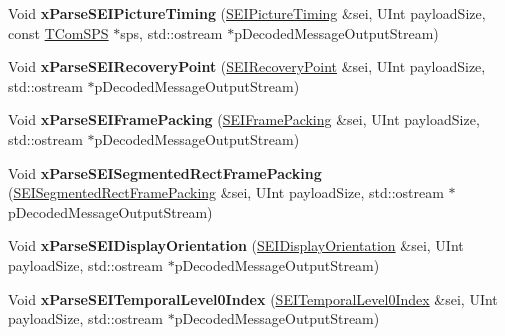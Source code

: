 \begin{DoxyCompactItemize}
\item 
\mbox{\label{class_s_e_i_reader_a5a13577a398a1304979b7cc699f063f2}} 
Void {\bfseries x\+Parse\+S\+E\+I\+Picture\+Timing} (\hyperlink{class_s_e_i_picture_timing}{S\+E\+I\+Picture\+Timing} \&sei, U\+Int payload\+Size, const \hyperlink{class_t_com_s_p_s}{T\+Com\+S\+PS} $\ast$sps, std\+::ostream $\ast$p\+Decoded\+Message\+Output\+Stream)
\item 
\mbox{\label{class_s_e_i_reader_a78c0dd29526c793e45607a6cb8aee412}} 
Void {\bfseries x\+Parse\+S\+E\+I\+Recovery\+Point} (\hyperlink{class_s_e_i_recovery_point}{S\+E\+I\+Recovery\+Point} \&sei, U\+Int payload\+Size, std\+::ostream $\ast$p\+Decoded\+Message\+Output\+Stream)
\item 
\mbox{\label{class_s_e_i_reader_a07832d571306452ccd60eece10ed1f34}} 
Void {\bfseries x\+Parse\+S\+E\+I\+Frame\+Packing} (\hyperlink{class_s_e_i_frame_packing}{S\+E\+I\+Frame\+Packing} \&sei, U\+Int payload\+Size, std\+::ostream $\ast$p\+Decoded\+Message\+Output\+Stream)
\item 
\mbox{\label{class_s_e_i_reader_a7844886fc0894def12a948687112ba4c}} 
Void {\bfseries x\+Parse\+S\+E\+I\+Segmented\+Rect\+Frame\+Packing} (\hyperlink{class_s_e_i_segmented_rect_frame_packing}{S\+E\+I\+Segmented\+Rect\+Frame\+Packing} \&sei, U\+Int payload\+Size, std\+::ostream $\ast$p\+Decoded\+Message\+Output\+Stream)
\item 
\mbox{\label{class_s_e_i_reader_a32fce67f07b27dbabdc8b8fc52d21277}} 
Void {\bfseries x\+Parse\+S\+E\+I\+Display\+Orientation} (\hyperlink{class_s_e_i_display_orientation}{S\+E\+I\+Display\+Orientation} \&sei, U\+Int payload\+Size, std\+::ostream $\ast$p\+Decoded\+Message\+Output\+Stream)
\item 
\mbox{\label{class_s_e_i_reader_a57a40374cf4f889921cd09c08f6f7e8a}} 
Void {\bfseries x\+Parse\+S\+E\+I\+Temporal\+Level0\+Index} (\hyperlink{class_s_e_i_temporal_level0_index}{S\+E\+I\+Temporal\+Level0\+Index} \&sei, U\+Int payload\+Size, std\+::ostream $\ast$p\+Decoded\+Message\+Output\+Stream)
\item 
\mbox{\label{class_s_e_i_reader_a98a4c4683b6cbf946ebfb18f2d2e2909}} 

\end{DoxyCompactItemize}

